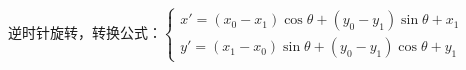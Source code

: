 逆时针旋转，转换公式：$\left\{\begin{matrix}
x'=(x_0-x_1)\cos\theta+(y_0-y_1)\sin\theta+x_1 \\ 
y'=(x_1-x_0)\sin\theta+(y_0-y_1)\cos\theta+y_1
\end{matrix}\right.$
